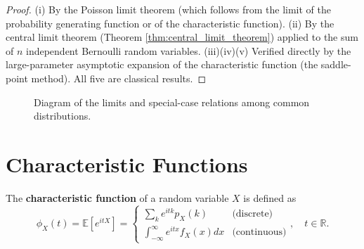 \begin{proof}
(i) By the Poisson limit theorem (which follows from the limit of the probability generating function or of the characteristic function). (ii) By the central limit theorem (Theorem \ref{thm:central_limit_theorem}) applied to the sum of $n$ independent Bernoulli random variables. (iii)(iv)(v) Verified directly by the large-parameter asymptotic expansion of the characteristic function (the saddle-point method). All five are classical results.
\end{proof}

\begin{figure}[htbp]
\centering
{}
\caption{Diagram of the limits and special-case relations among common distributions.}
\label{fig:distribution_relations}
\end{figure}

\section{Characteristic Functions}\label{sec:characteristic_function}

\begin{definition}\label{def:characteristic_function}
The \textbf{characteristic function} of a random variable $X$ is defined as
\[
\phi_X(t) = \mathbb{E}[e^{itX}] =
\begin{cases}
\sum_k e^{itk} p_X(k) & \text{(discrete)} \\
\int_{-\infty}^{\infty} e^{itx} f_X(x) dx & \text{(continuous)}
\end{cases}, \quad t \in \mathbb{R}.
\]
\end{definition}

